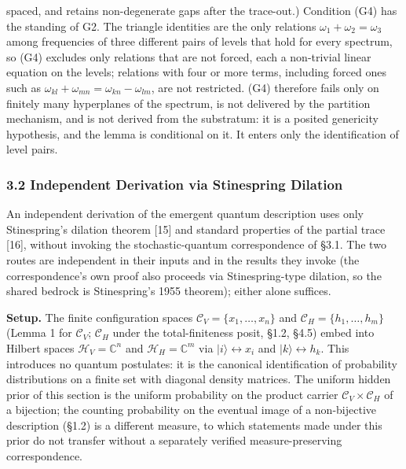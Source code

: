 \documentclass[
]{article}
\begin{document}
spaced, and retains non-degenerate gaps after the trace-out.) Condition
(G4) has the standing of G2. The triangle identities are the only
relations \(\omega_1 + \omega_2 = \omega_3\) among frequencies of three
different pairs of levels that hold for every spectrum, so (G4) excludes
only relations that are not forced, each a non-trivial linear equation
on the levels; relations with four or more terms, including forced ones
such as \(\omega_{kl} + \omega_{mn} = \omega_{kn} - \omega_{lm}\), are
not restricted. (G4) therefore fails only on finitely many hyperplanes
of the spectrum, is not delivered by the partition mechanism, and is not
derived from the substratum: it is a posited genericity hypothesis, and
the lemma is conditional on it. It enters only the identification of
level pairs.

\hypertarget{independent-derivation-via-stinespring-dilation}{%
\subsubsection{3.2 Independent Derivation via Stinespring
Dilation}\label{independent-derivation-via-stinespring-dilation}}

An independent derivation of the emergent quantum description uses only
Stinespring's dilation theorem {[}15{]} and standard properties of the
partial trace {[}16{]}, without invoking the stochastic-quantum
correspondence of §3.1. The two routes are independent in their inputs
and in the results they invoke (the correspondence's own proof also
proceeds via Stinespring-type dilation, so the shared bedrock is
Stinespring's 1955 theorem); either alone suffices.

\textbf{Setup.} The finite configuration spaces
\(\mathcal{C}_V = \{x_1, \ldots, x_n\}\) and
\(\mathcal{C}_H = \{h_1, \ldots, h_m\}\) (Lemma 1 for \(\mathcal{C}_V\);
\(\mathcal{C}_H\) under the total-finiteness posit, §1.2, §4.5) embed
into Hilbert spaces \(\mathcal{H}_V = \mathbb{C}^n\) and
\(\mathcal{H}_H = \mathbb{C}^m\) via \(|i\rangle \leftrightarrow x_i\)
and \(|k\rangle \leftrightarrow h_k\). This introduces no quantum
postulates: it is the canonical identification of probability
distributions on a finite set with diagonal density matrices. The
uniform hidden prior of this section is the uniform probability on the
product carrier \(\mathcal{C}_V \times \mathcal{C}_H\) of a bijection;
the counting probability on the eventual image of a non-bijective
description (§1.2) is a different measure, to which statements made
under this prior do not transfer without a separately verified
measure-preserving correspondence.
\end{document}
